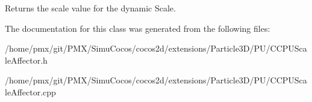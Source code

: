 Returns the scale value for the dynamic Scale. 

The documentation for this class was generated from the following files\+:\begin{DoxyCompactItemize}
\item 
/home/pmx/git/\+P\+M\+X/\+Simu\+Cocos/cocos2d/extensions/\+Particle3\+D/\+P\+U/C\+C\+P\+U\+Scale\+Affector.\+h\item 
/home/pmx/git/\+P\+M\+X/\+Simu\+Cocos/cocos2d/extensions/\+Particle3\+D/\+P\+U/C\+C\+P\+U\+Scale\+Affector.\+cpp\end{DoxyCompactItemize}
